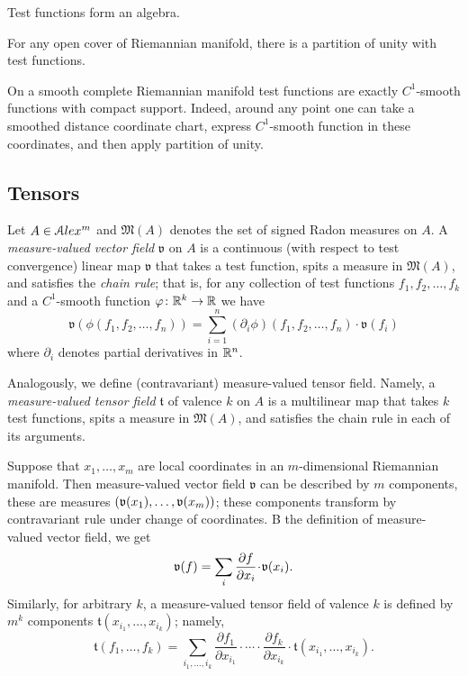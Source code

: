 Test functions form an algebra.

For any open cover of Riemannian manifold, there is a partition of unity with test functions.

On a smooth complete Riemannian manifold test functions
are exactly $C^1$-smooth functions with compact support.
Indeed, around any point one can take a
smoothed distance 
coordinate chart, express $C^1$-smooth function in these 
coordinates, and then apply partition of unity. 
 
 
\subsection{Tensors}



Let $A\in \mathcal{A}lex^m$ and $\mathfrak M(A)$
denotes the set of signed Radon measures on $A$.
A \emph{measure-valued vector field} $\mathfrak{v}$  on $A$
is a  continuous (with respect to test convergence) linear map
$\mathfrak{v}$ that takes a test function,
spits a measure in $\mathfrak M(A)$,
and satisfies the \emph{chain rule};
that is, for any collection of test functions $f_1,f_2,\dots,f_k$
and a $C^1$-smooth function $\varphi\colon\mathbb{R}^k\to\mathbb{R}$ we have
$$\mathfrak{v}(\phi(f_1,f_2,\dots,f_n))
=
\sum_{i=1}^n (\partial_i\phi)(f_1,f_2,\dots,f_n)\cdot\mathfrak{v}(f_i)$$
where $\partial_i$ denotes partial derivatives in $\mathbb{R}^n$.

Analogously, we define (contravariant) measure-valued tensor field.
Namely, a \emph{measure-valued tensor field} $\mathfrak{t}$ of valence $k$ on $A$ is a multilinear map that takes $k$ test functions, spits a measure in $\mathfrak M(A)$, and satisfies the chain rule in each of its arguments.

Suppose that $x_1,\dots,x_m$ are local coordinates in an $m$-dimensional Riemannian manifold.
Then measure-valued vector field $\mathfrak{v}$ can be described by $m$ components, these are measures $(\mathfrak{v}(x_1),\dots,\mathfrak{v}(x_m))$;
these components transform by contravariant rule under change of coordinates.
B the definition of measure-valued vector field, we get
\[\mathfrak{v}(f)=\sum_{i}\frac{\partial f}{\partial x_i}\cdot \vv(x_i).\]
Similarly, for arbitrary $k$, a measure-valued tensor field of valence $k$ is defined by $m^k$ components 
$\mathfrak{t}(x_{i_1},\dots,x_{i_k})$; namely,
\[\mathfrak{t}(f_1,\dots,f_k)=\sum_{i_1,\dots,i_k}
\frac{\partial f_1}{\partial x_{i_1}}\cdot 
 \cdots \cdot\frac{\partial f_k}{\partial x_{i_k}}
\cdot \mathfrak{t}(x_{i_1},\dots,x_{i_k}).\]


